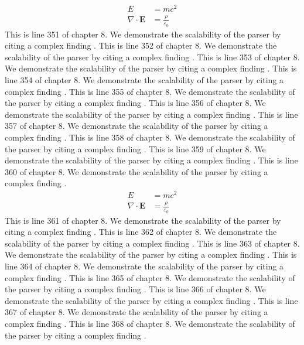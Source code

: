 \begin{align*}
  E &= mc^2 \\
  \nabla \cdot \mathbf{E} &= \frac{\rho}{\varepsilon_0}
\end{align*}
This is line 351 of chapter 8. We demonstrate the scalability of the parser by citing a complex finding \cite{ref8_351}.
This is line 352 of chapter 8. We demonstrate the scalability of the parser by citing a complex finding \cite{ref8_352}.
This is line 353 of chapter 8. We demonstrate the scalability of the parser by citing a complex finding \cite{ref8_353}.
This is line 354 of chapter 8. We demonstrate the scalability of the parser by citing a complex finding \cite{ref8_354}.
This is line 355 of chapter 8. We demonstrate the scalability of the parser by citing a complex finding \cite{ref8_355}.
This is line 356 of chapter 8. We demonstrate the scalability of the parser by citing a complex finding \cite{ref8_356}.
This is line 357 of chapter 8. We demonstrate the scalability of the parser by citing a complex finding \cite{ref8_357}.
This is line 358 of chapter 8. We demonstrate the scalability of the parser by citing a complex finding \cite{ref8_358}.
This is line 359 of chapter 8. We demonstrate the scalability of the parser by citing a complex finding \cite{ref8_359}.
This is line 360 of chapter 8. We demonstrate the scalability of the parser by citing a complex finding \cite{ref8_360}.
\begin{align*}
  E &= mc^2 \\
  \nabla \cdot \mathbf{E} &= \frac{\rho}{\varepsilon_0}
\end{align*}
This is line 361 of chapter 8. We demonstrate the scalability of the parser by citing a complex finding \cite{ref8_361}.
This is line 362 of chapter 8. We demonstrate the scalability of the parser by citing a complex finding \cite{ref8_362}.
This is line 363 of chapter 8. We demonstrate the scalability of the parser by citing a complex finding \cite{ref8_363}.
This is line 364 of chapter 8. We demonstrate the scalability of the parser by citing a complex finding \cite{ref8_364}.
This is line 365 of chapter 8. We demonstrate the scalability of the parser by citing a complex finding \cite{ref8_365}.
This is line 366 of chapter 8. We demonstrate the scalability of the parser by citing a complex finding \cite{ref8_366}.
This is line 367 of chapter 8. We demonstrate the scalability of the parser by citing a complex finding \cite{ref8_367}.
This is line 368 of chapter 8. We demonstrate the scalability of the parser by citing a complex finding \cite{ref8_368}.
